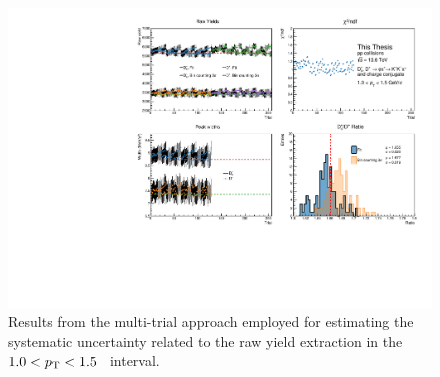 \begin{figure}[htb]
    \centering
    \includegraphics[width=\textwidth]{Figures/Chapter 5/RawYieldSyst.pdf}
    \caption{Results from the multi-trial approach employed for estimating the systematic uncertainty related to the raw yield extraction in the \mbox{$1.0<p_\mathrm{T}<1.5$~\gevc} interval.}
    \label{fig:raw_yield_syst}
\end{figure}

